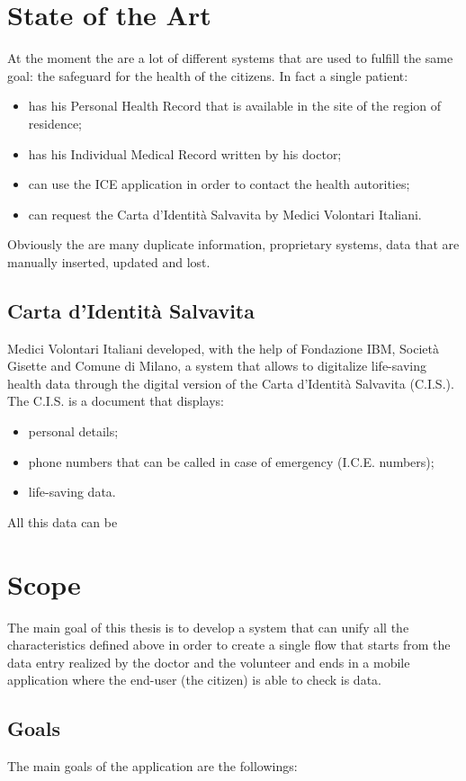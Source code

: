 \documentclass[oneside]{book}
\begin{document}
\section{State of the Art}
At the moment the are a lot of different systems that are used to fulfill the same goal: the safeguard for the health of the citizens. In fact a single patient:
\begin{itemize}
\item has his Personal Health Record that is available in the site of the region of residence;
\item has his Individual Medical Record written by his doctor;
\item can use the ICE application in order to contact the health autorities;
\item can request the Carta d'Identità Salvavita by Medici Volontari Italiani.
\end{itemize}
Obviously the are many duplicate information, proprietary systems, data that are manually inserted, updated and lost.

\subsection{Carta d'Identità Salvavita}
Medici Volontari Italiani developed, with the help of Fondazione IBM, Società Gisette and Comune di Milano, a system that allows to digitalize life-saving health data through the digital version of the Carta d'Identità Salvavita (C.I.S.).\newline
The C.I.S. is a document that displays:
\begin{itemize}
\item personal details;
\item phone numbers that can be called in case of emergency (I.C.E. numbers);
\item life-saving data.
\end{itemize}
All this data can be 

\section{Scope}
The main goal of this thesis is to develop a system that can unify all the characteristics defined above in order to create a single flow that starts from the data entry realized by the doctor and the volunteer and ends in a mobile application where the end-user (the citizen) is able to check is data.

\subsection{Goals}
The main goals of the application are the followings:
\end{document}
